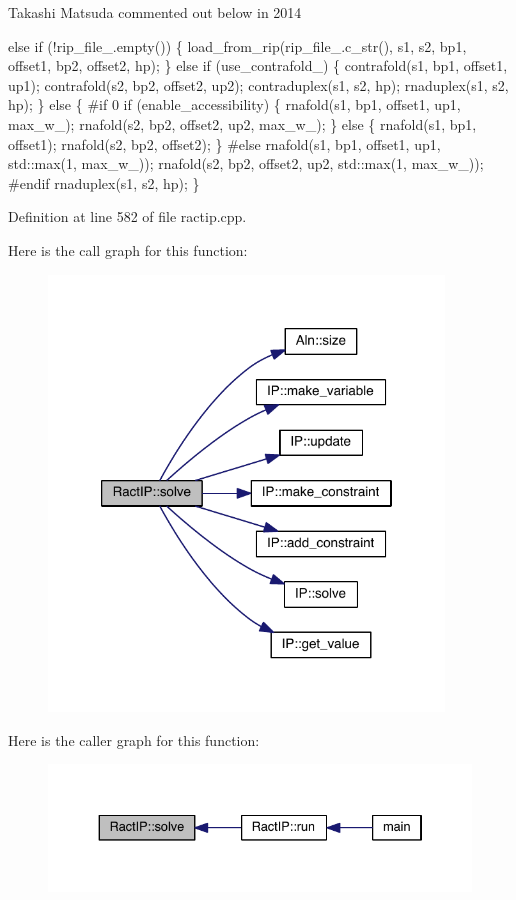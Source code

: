 \begin{DoxyVerb} Takashi Matsuda commented out below in 2014
\end{DoxyVerb}
 else if (!rip\+\_\+file\+\_\+.empty()) \{ load\+\_\+from\+\_\+rip(rip\+\_\+file\+\_\+.\+c\+\_\+str(), s1, s2, bp1, offset1, bp2, offset2, hp); \} else if (use\+\_\+contrafold\+\_\+) \{ contrafold(s1, bp1, offset1, up1); contrafold(s2, bp2, offset2, up2); contraduplex(s1, s2, hp); rnaduplex(s1, s2, hp); \} else \{ \#if 0 if (enable\+\_\+accessibility) \{ rnafold(s1, bp1, offset1, up1, max\+\_\+w\+\_\+); rnafold(s2, bp2, offset2, up2, max\+\_\+w\+\_\+); \} else \{ rnafold(s1, bp1, offset1); rnafold(s2, bp2, offset2); \} \#else rnafold(s1, bp1, offset1, up1, std\+::max(1, max\+\_\+w\+\_\+)); rnafold(s2, bp2, offset2, up2, std\+::max(1, max\+\_\+w\+\_\+)); \#endif rnaduplex(s1, s2, hp); \} 

Definition at line 582 of file ractip.\+cpp.



Here is the call graph for this function\+:
\nopagebreak
\begin{figure}[H]
\begin{center}
\leavevmode
\includegraphics[width=298pt]{class_ract_i_p_a53487d2366928d9665acc8876a734b85_cgraph}
\end{center}
\end{figure}




Here is the caller graph for this function\+:
\nopagebreak
\begin{figure}[H]
\begin{center}
\leavevmode
\includegraphics[width=334pt]{class_ract_i_p_a53487d2366928d9665acc8876a734b85_icgraph}
\end{center}
\end{figure}




